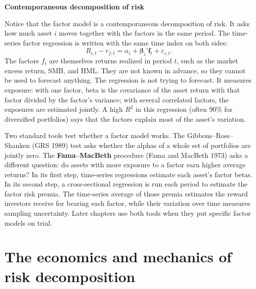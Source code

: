 \begin{callout}
\noindent \textbf{Contemporaneous decomposition of risk}

Notice that the factor model is a contemporaneous decomposition of risk. It asks how much asset $i$ moves together with the factors in the same period. 
The time-series factor regression is written with the same time index on both sides:
\begin{equation}
R_{i,t} - r_{f,t} = \alpha_i + \boldsymbol{\beta}_i' \mathbf{f}_t + \varepsilon_{i,t}.
\end{equation}
The factors $f_t$ are themselves returns realized in period $t$, such as the market excess return, SMB, and HML. They are not known in advance, so they cannot be used to forecast anything. The regression is not trying to forecast. It measures exposure: with one factor, beta is the covariance of the asset return with that factor divided by the factor's variance; with several correlated factors, the exposures are estimated jointly. A high $R^2$ in this regression (often 90\% 
for diversified portfolios) says that the factors explain most of the asset’s variation.
\end{callout}

Two standard tools test whether a factor model works. The Gibbons--Ross--Shanken (GRS 1989) test asks whether the alphas of a whole set of portfolios are jointly zero. The \textbf{Fama--MacBeth} procedure (Fama and MacBeth 1973) asks a different question: do assets with more exposure to a factor earn higher average returns? In its first step, time-series regressions estimate each asset's factor betas. In its second step, a cross-sectional regression is run each period to estimate the factor risk premia. The time-series average of those premia estimates the reward investors receive for bearing each factor, while their variation over time measures sampling uncertainty. Later chapters use both tools when they put specific factor models on trial.

\section{The economics and mechanics of risk decomposition}
\label{sec:03-decomposition}

